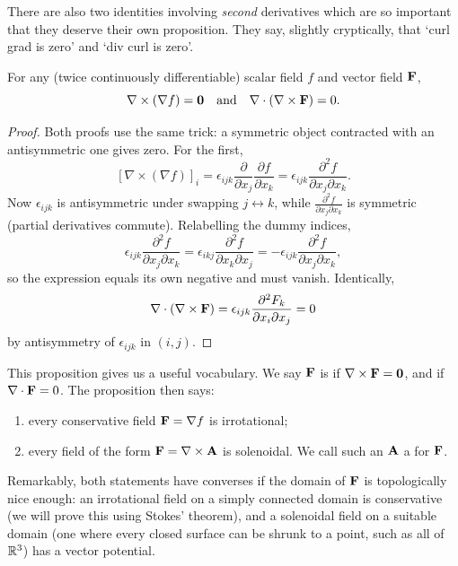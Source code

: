 \documentclass[a4paper]{scrartcl}
\begin{document}
There are also two identities involving \emph{second} derivatives which are so important that they deserve their own proposition. They say, slightly cryptically, that `curl grad is zero' and `div curl is zero'.

\begin{proposition}
	For any (twice continuously differentiable) scalar field $f$ and vector field $\mathbf{F}$,
	$$
	\nabla \times (\nabla f) = \mathbf{0} \quad \text{and} \quad \nabla \cdot (\nabla \times \mathbf{F}) = 0.
	$$
\end{proposition}
\begin{proof}
	Both proofs use the same trick: a symmetric object contracted with an antisymmetric one gives zero. For the first,
	$$
	[\nabla \times (\nabla f)]_i = \epsilon_{ijk} \frac{\partial}{\partial x_j} \frac{\partial f}{\partial x_k} = \epsilon_{ijk} \frac{\partial^2 f}{\partial x_j \partial x_k}.
	$$
	Now $\epsilon_{ijk}$ is antisymmetric under swapping $j \leftrightarrow k$, while $\frac{\partial^2 f}{\partial x_j \partial x_k}$ is symmetric (partial derivatives commute). Relabelling the dummy indices,
	$$
	\epsilon_{ijk} \frac{\partial^2 f}{\partial x_j \partial x_k} = \epsilon_{ikj} \frac{\partial^2 f}{\partial x_k \partial x_j} = -\epsilon_{ijk} \frac{\partial^2 f}{\partial x_j \partial x_k},
	$$
	so the expression equals its own negative and must vanish. Identically,
	$$
	\nabla \cdot (\nabla \times \mathbf{F}) = \epsilon_{ijk}\frac{\partial^2 F_k}{\partial x_i \partial x_j} = 0
	$$
	by antisymmetry of $\epsilon_{ijk}$ in $(i, j)$.
\end{proof}

This proposition gives us a useful vocabulary. We say $\mathbf{F}$ is  if $\nabla \times \mathbf{F} = \mathbf{0}$, and  if $\nabla \cdot \mathbf{F} = 0$. The proposition then says:
\begin{enumerate}[label=(\roman*)]
	\item every conservative field $\mathbf{F} = \nabla f$ is irrotational;
	\item every field of the form $\mathbf{F} = \nabla \times \mathbf{A}$ is solenoidal. We call such an $\mathbf{A}$ a  for $\mathbf{F}$.
\end{enumerate}
Remarkably, both statements have converses if the domain of $\mathbf{F}$ is topologically nice enough: an irrotational field on a simply connected domain is conservative (we will prove this using Stokes' theorem), and a solenoidal field on a suitable domain (one where every closed surface can be shrunk to a point, such as all of $\mathbb{R}^3$) has a vector potential.
\end{document}
